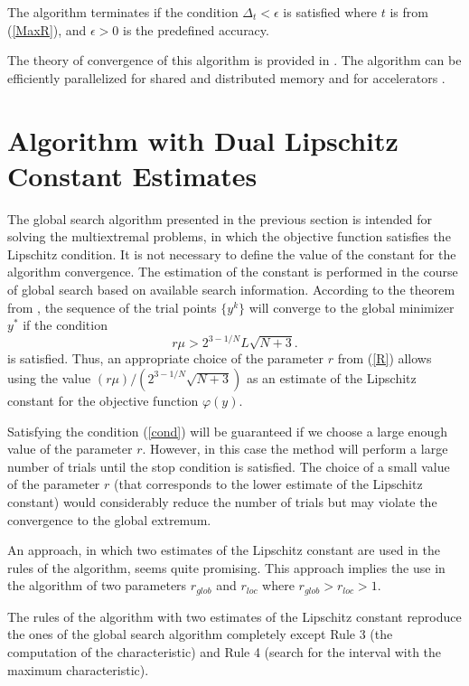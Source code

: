 \documentclass[runningheads]{llncs}
\begin{document}
The algorithm terminates if the condition $\Delta_t < \epsilon$ is satisfied
where $t$ is from (\ref{MaxR}), and $\epsilon>0$ is the predefined accuracy. 

The theory of convergence of this algorithm is provided in \cite{Strongin2000}. 
The algorithm can be efficiently parallelized for shared and distributed memory \cite{Gergel2003}  and for accelerators \cite{Gergel2016}.


\section{Algorithm with Dual Lipschitz Constant Estimates}


The global search algorithm presented in the previous section is intended for solving the multiextremal problems, in which the objective function satisfies the Lipschitz condition. It is not necessary to define the value of the constant for the algorithm convergence. The estimation of the constant is performed in the course of global search based on available search information. 
According to the theorem from \cite{Strongin2000}, the sequence of the trial points $\{y^k\}$ will converge to the global minimizer $y^*$ if the condition 
\begin{equation}\label{cond}
r\mu > 2^{3-1/N}L\sqrt{N+3}.
\end{equation}
\noindent is satisfied. Thus,  an appropriate choice of the parameter $r$ from (\ref{R}) allows using the value $(r\mu) / (2^{3-1/N}\sqrt{N+3})$ as an estimate of the Lipschitz constant for the objective function $\varphi(y)$.

Satisfying the condition (\ref{cond}) will be guaranteed if we choose a large enough value of the parameter $r$. However, in this case the method will perform a large number of trials until the stop condition is satisfied.
The choice of a small value of the parameter $r$ (that corresponds to the lower estimate of the Lipschitz constant) would considerably reduce the number of trials but may violate the convergence to the global extremum.

An approach, in which two estimates of the Lipschitz constant %
are used in the rules of the algorithm, seems quite promising. 
This approach implies the use in the algorithm of two parameters $r_{glob}$ and $r_{loc}$ where $r_{glob} > r_{loc}>1$.

The rules of the algorithm with two estimates of the Lipschitz constant reproduce the ones of the global search algorithm completely except Rule 3 (the computation of the characteristic) and Rule 4 (search for the interval with the maximum characteristic).
\end{document}
